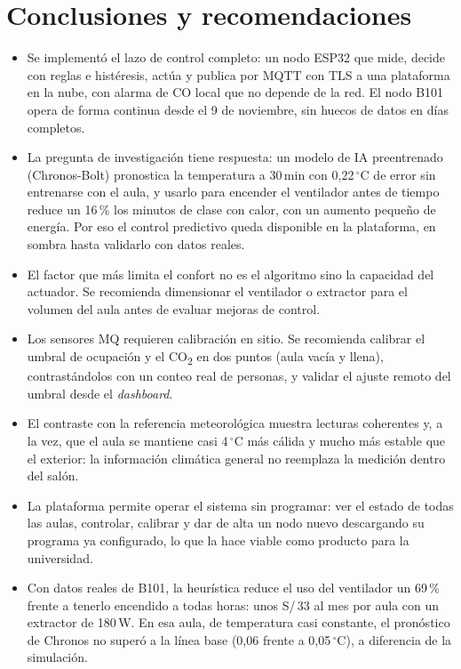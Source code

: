 \documentclass[10pt,a4paper]{article}
\newcommand{\COd}{CO\textsubscript{2}}
\begin{document}
\section{Conclusiones y recomendaciones}
\begin{itemize}[leftmargin=12pt]
  \item Se implementó el lazo de control completo: un nodo ESP32 que mide, decide con reglas e histéresis, actúa y publica por MQTT con TLS a una plataforma en la nube, con alarma de CO local que no depende de la red. El nodo B101 opera de forma continua desde el 9 de noviembre, sin huecos de datos en días completos.
  \item La pregunta de investigación tiene respuesta: un modelo de IA preentrenado (Chronos-Bolt) pronostica la temperatura a 30\,min con 0,22\,$^\circ$C de error sin entrenarse con el aula, y usarlo para encender el ventilador antes de tiempo reduce un 16\,\% los minutos de clase con calor, con un aumento pequeño de energía. Por eso el control predictivo queda disponible en la plataforma, en sombra hasta validarlo con datos reales.
  \item El factor que más limita el confort no es el algoritmo sino la capacidad del actuador. Se recomienda dimensionar el ventilador o extractor para el volumen del aula antes de evaluar mejoras de control.
  \item Los sensores MQ requieren calibración en sitio. Se recomienda calibrar el umbral de ocupación y el \COd{} en dos puntos (aula vacía y llena), contrastándolos con un conteo real de personas, y validar el ajuste remoto del umbral desde el \emph{dashboard}.
  \item El contraste con la referencia meteorológica muestra lecturas coherentes y, a la vez, que el aula se mantiene casi 4\,$^\circ$C más cálida y mucho más estable que el exterior: la información climática general no reemplaza la medición dentro del salón.
  \item La plataforma permite operar el sistema sin programar: ver el estado de todas las aulas, controlar, calibrar y dar de alta un nodo nuevo descargando su programa ya configurado, lo que la hace viable como producto para la universidad.
  \item Con datos reales de B101, la heurística reduce el uso del ventilador un 69\,\% frente a tenerlo encendido a todas horas: unos S/\,33 al mes por aula con un extractor de 180\,W. En esa aula, de temperatura casi constante, el pronóstico de Chronos no superó a la línea base (0,06 frente a 0,05\,$^\circ$C), a diferencia de la simulación.

\end{itemize}
\end{document}
